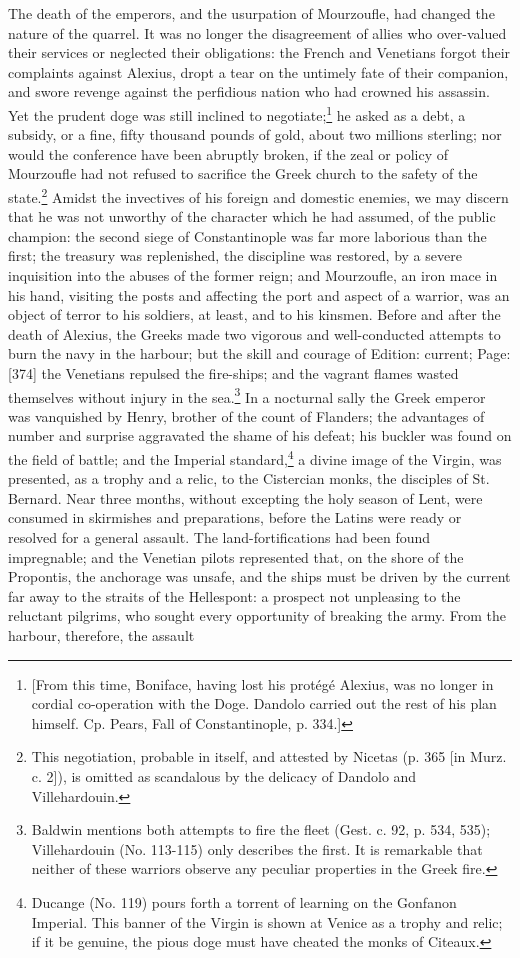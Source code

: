 The death of the emperors, and the usurpation of Mourzoufle, had changed the nature of the quarrel. It was no longer the disagreement of allies who over-valued their services or neglected their obligations: the French and Venetians forgot their complaints against Alexius, dropt a tear on the untimely fate of their companion, and swore revenge against the perfidious nation who had crowned his assassin. Yet the prudent doge was still inclined to negotiate;\footnote{[From this time, Boniface, having lost his protégé Alexius, was no longer in cordial co-operation with the Doge. Dandolo carried out the rest of his plan himself. Cp. Pears, Fall of Constantinople, p. 334.]} he asked as a debt, a subsidy, or a fine, fifty thousand pounds of gold, about two millions sterling; nor would the conference have been abruptly broken, if the zeal or policy of Mourzoufle had not refused to sacrifice the Greek church to the safety of the state.\footnote{This negotiation, probable in itself, and attested by Nicetas (p. 365 [in Murz. c. 2]), is omitted as scandalous by the delicacy of Dandolo and Villehardouin.} Amidst the invectives of his foreign and domestic enemies, we may discern that he was not unworthy of the character which he had assumed, of the public champion: the second siege of Constantinople was far more laborious than the first; the treasury was replenished, the discipline was restored, by a severe inquisition into the abuses of the former reign; and Mourzoufle, an iron mace in his hand, visiting the posts and affecting the port and aspect of a warrior, was an object of terror to his soldiers, at least, and to his kinsmen. Before and after the death of Alexius, the Greeks made two vigorous and well-conducted attempts to burn the navy in the harbour; but the skill and courage of Edition: current; Page: [374] the Venetians repulsed the fire-ships; and the vagrant flames wasted themselves without injury in the sea.\footnote{Baldwin mentions both attempts to fire the fleet (Gest. c. 92, p. 534, 535); Villehardouin (No. 113-115) only describes the first. It is remarkable that neither of these warriors observe any peculiar properties in the Greek fire.} In a nocturnal sally the Greek emperor was vanquished by Henry, brother of the count of Flanders; the advantages of number and surprise aggravated the shame of his defeat; his buckler was found on the field of battle; and the Imperial standard,\footnote{Ducange (No. 119) pours forth a torrent of learning on the Gonfanon Imperial. This banner of the Virgin is shown at Venice as a trophy and relic; if it be genuine, the pious doge must have cheated the monks of Citeaux.} a divine image of the Virgin, was presented, as a trophy and a relic, to the Cistercian monks, the disciples of St. Bernard. Near three months, without excepting the holy season of Lent, were consumed in skirmishes and preparations, before the Latins were ready or resolved for a general assault. The land-fortifications had been found impregnable; and the Venetian pilots represented that, on the shore of the Propontis, the anchorage was unsafe, and the ships must be driven by the current far away to the straits of the Hellespont: a prospect not unpleasing to the reluctant pilgrims, who sought every opportunity of breaking the army. From the harbour, therefore, the assault 